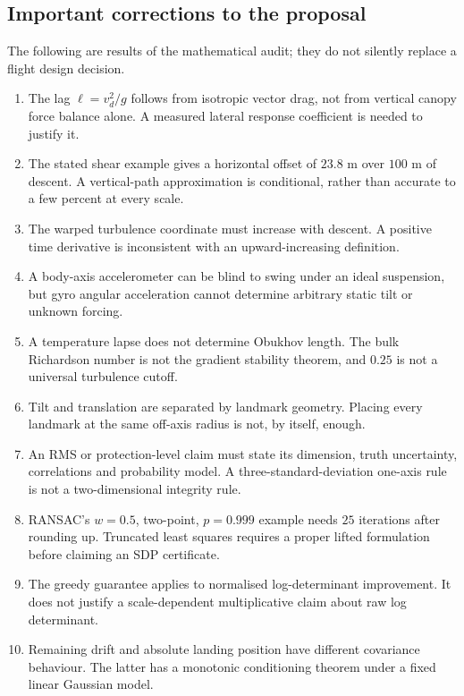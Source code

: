 \documentclass[11pt,a4paper]{article}
\numberwithin{equation}{section}
\begin{document}
\subsection{Important corrections to the proposal}
The following are results of the mathematical audit; they do not silently replace a flight design decision.
\begin{enumerate}
\item The lag $\ell=v_d^2/g$ follows from isotropic vector drag, not from vertical canopy force balance alone. A measured lateral response coefficient is needed to justify it.
\item The stated shear example gives a horizontal offset of $23.8$ m over $100$ m of descent. A vertical-path approximation is conditional, rather than accurate to a few percent at every scale.
\item The warped turbulence coordinate must increase with descent. A positive time derivative is inconsistent with an upward-increasing definition.
\item A body-axis accelerometer can be blind to swing under an ideal suspension, but gyro angular acceleration cannot determine arbitrary static tilt or unknown forcing.
\item A temperature lapse does not determine Obukhov length. The bulk Richardson number is not the gradient stability theorem, and $0.25$ is not a universal turbulence cutoff.
\item Tilt and translation are separated by landmark geometry. Placing every landmark at the same off-axis radius is not, by itself, enough.
\item An RMS or protection-level claim must state its dimension, truth uncertainty, correlations and probability model. A three-standard-deviation one-axis rule is not a two-dimensional integrity rule.
\item RANSAC's $w=0.5$, two-point, $p=0.999$ example needs $25$ iterations after rounding up. Truncated least squares requires a proper lifted formulation before claiming an SDP certificate.
\item The greedy guarantee applies to normalised log-determinant improvement. It does not justify a scale-dependent multiplicative claim about raw log determinant.
\item Remaining drift and absolute landing position have different covariance behaviour. The latter has a monotonic conditioning theorem under a fixed linear Gaussian model.
\end{enumerate}
\end{document}
